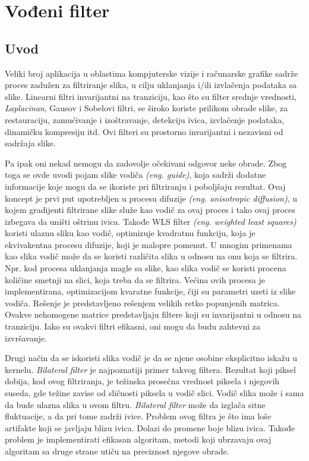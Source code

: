 \documentclass[a4paper,12pt,titlepage]{article}
\begin{document}
\section{Vođeni filter}\label{4}%

\subsection{Uvod}%

Veliki broj aplikacija u oblastima kompjuterske vizije i računarske grafike sadrže proces zadužen za filtriranje slika, u cilju uklanjanja i/ili izvlačenja podataka sa slike. Linearni filtri invarijantni na tranziciju, kao što su filter srednje vrednosti, \emph{Laplacinan}, Gausov i Sobelovi filtri, se široko koriste prilikom obrade slike, za restauraciju, zamućivanje i izoštravanje, detekciju ivica, izvlačenje podataka, dinamičku kompresiju itd. Ovi filteri su prostorno invarijantni i nezavisni od sadržaja slike. 

Pa ipak oni nekad nemogu da zadovolje očekivani odgovor neke obrade. Zbog toga se ovde uvodi pojam slike vodiča \emph{(eng. guide)}, koja sadrži dodatne informacije koje mogu da se ikoriste pri filtriranju i poboljšaju rezultat. Ovaj koncept je prvi put upotrebljen u procesu difuzije \emph{(eng. anisotropic diffusion)}, u kojem gradijenti filtrirane slike služe kao vodič za ovaj proces i tako ovaj proces izbegava da uništi oštrinu ivica. Takođe WLS filter \emph{(eng. weighted least squares)} koristi ulaznu sliku kao vodič, optimizuje kvadratnu funkciju, koja je ekvivakentna procesu difuzije, koji je malopre pomenut. U mnogim primenama kao slika vodič može da se koristi različita slika u odnosu na onu koja se filtrira. Npr. kod procesa uklanjanja magle sa slike, kao slika vodič se koristi procena količine smetnji na slici, koja treba da se filtrira. Većina ovih procesa je implementirana, optimizacijom kvaratne funkcije, čiji su parametri uzeti iz slike vodiča. Rešenje je predstavljeno rešenjem velikih retko popunjenih matrica. Ovakve nehomogene matrice predstavljaju filtere koji su invarijantni u odnosu na tranziciju. Iako su ovakvi filtri efikasni, oni mogu da budu zahtevni za izvršavanje.

Drugi način da se iskoristi slika vodič je da se njene osobine eksplicitno iskažu u kernelu. \emph{Bilateral filter} je najpoznatiji primer takvog filtera. Rezultat koji piksel dobija, kod ovog filtriranja, je težinska prosečna vrednost piksela i njegovih suseda, gde težine zavise od sličnosti piksela u vodič slici. Vodič slika može i sama da bude ulazna slika u ovom filtru. \emph{Bilateral filter} može da izglača sitne fluktuacije, a da pri tome zadrži ivice. Problem ovog filtra je što ima loše artifakte koji se javljaju blizu ivica. Dolazi do promene boje blizu ivica. Takođe problem je implementirati efikasan algoritam, metodi koji ubrzavaju ovaj algoritam sa druge strane utiču na preciznost njegove obrade.
\end{document}
